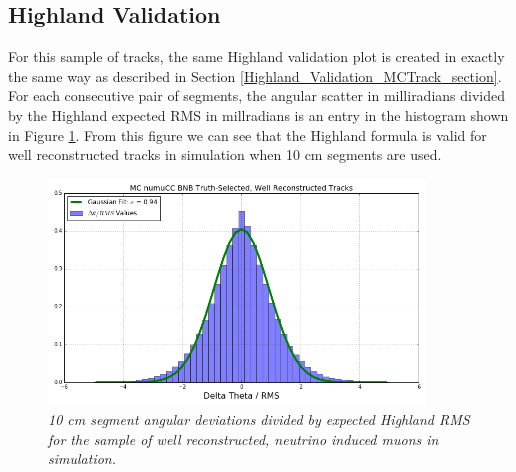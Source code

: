\subsection{Highland Validation}\label{Highland_Validation_MCBNBRecoTrack_section}
For this sample of tracks, the same Highland validation plot is created in exactly the same way as described in Section \ref{Highland_Validation_MCTrack_section}. For each consecutive pair of segments, the angular scatter in milliradians divided by the Highland expected RMS in millradians is an entry in the histogram shown in Figure \ref{Highland_validation_MCBNBRecoTrack_fig}. From this figure we can see that the Highland formula is valid for well reconstructed tracks in simulation when 10 cm segments are used.

\begin{figure}[ht!]
\begin{center}
\includegraphics[width=100mm]{Figures/Highland_validation_MCBNBRecoTrack.png}
\end{center}
\caption{\textit{10 cm segment angular deviations divided by expected Highland RMS for the sample of well reconstructed, neutrino induced muons in simulation.}}
\label{Highland_validation_MCBNBRecoTrack_fig}
\end{figure}


